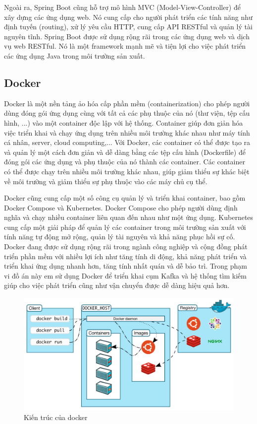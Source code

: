 \documentclass[../DoAn.tex]{subfiles}
\begin{document}
Ngoài ra, Spring Boot cũng hỗ trợ mô hình MVC (Model-View-Controller) để xây dựng các ứng dụng web. Nó cung cấp cho người phát triển các tính năng như định tuyến (routing), xử lý yêu cầu HTTP, cung cấp API RESTful và quản lý tài nguyên tĩnh. Spring Boot được sử dụng rộng rãi trong các ứng dụng web và dịch vụ web RESTful. Nó là một framework mạnh mẽ và tiện lợi cho việc phát triển các ứng dụng Java trong môi trường sản xuất.
\subsection{Docker}
\label{subsection:3.3.3}

Docker là một nền tảng ảo hóa cấp phần mềm (containerization) cho phép người dùng đóng gói ứng dụng cùng với tất cả các phụ thuộc của nó (thư viện, tệp cấu hình, ...) vào một container độc lập với hệ thống. Container giúp đơn giản hóa việc triển khai và chạy ứng dụng trên nhiều môi trường khác nhau như máy tính cá nhân, server, cloud computing,... Với Docker, các container có thể được tạo ra và quản lý một cách đơn giản và dễ dàng bằng các tệp cấu hình (Dockerfile) để đóng gói các ứng dụng và phụ thuộc của nó thành các container. Các container có thể được chạy trên nhiều môi trường khác nhau, giúp giảm thiểu sự khác biệt về môi trường và giảm thiểu sự phụ thuộc vào các máy chủ cụ thể.

Docker cũng cung cấp một số công cụ quản lý và triển khai container, bao gồm Docker Compose và Kubernetes. Docker Compose cho phép người dùng định nghĩa và chạy nhiều container liên quan đến nhau như một ứng dụng. Kubernetes cung cấp một giải pháp để quản lý các container trong môi trường sản xuất với tính năng tự động mở rộng, quản lý tài nguyên và khả năng phục hồi sự cố. Docker đang được sử dụng rộng rãi trong ngành công nghiệp và cộng đồng phát triển phần mềm với nhiều lợi ích như tăng tính di động, khả năng phát triển và triển khai ứng dụng nhanh hơn, tăng tính nhất quán và dễ bảo trì. Trong phạm vi đồ án này em sử dụng Docker để triển khai cụm Kafka và hệ thống tìm kiếm giúp cho việc phát triển cũng như vận chuyển được dễ dàng hiệu quả hơn.

\begin{figure}[H]
    \centering
    \includegraphics[scale=0.4]{Hinhve/docker_architecture.png}
    \caption{Kiến trúc của docker}
    \label{fig:my_label2}
\end{figure}
\end{document}
